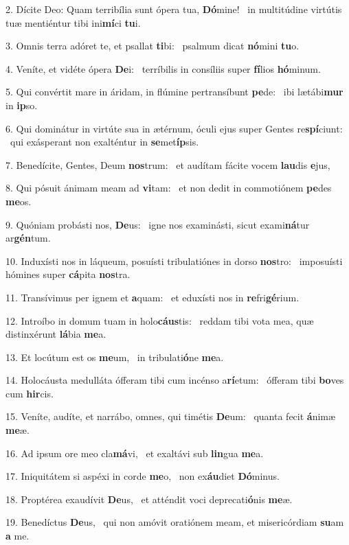 2. Dícite Deo: Quam terribília sunt ópera tua, \textbf{Dó}mine! \ast\  in multitúdine virtútis tuæ mentiéntur tibi ini\textbf{mí}ci \textbf{tu}i.\

3. Omnis terra adóret te, et psallat \textbf{ti}bi: \ast\  psalmum dicat \textbf{nó}mini \textbf{tu}o.\

4. Veníte, et vidéte ópera \textbf{De}i: \ast\  terríbilis in consíliis super \textbf{fí}lios \textbf{hó}minum.\

5. Qui convértit mare in áridam, in flúmine pertransíbunt \textbf{pe}de: \ast\  ibi lætábi\textbf{mur} in \textbf{ip}so.\

6. Qui dominátur in virtúte sua in ætérnum, óculi ejus super Gentes re\textbf{spí}ciunt: \ast\  qui exásperant non exalténtur in \textbf{se}met\textbf{íp}sis.\

7. Benedícite, Gentes, Deum \textbf{nos}trum: \ast\  et audítam fácite vocem \textbf{lau}dis \textbf{e}jus,\

8. Qui pósuit ánimam meam ad \textbf{vi}tam: \ast\  et non dedit in commotiónem \textbf{pe}des \textbf{me}os.\

9. Quóniam probásti nos, \textbf{De}us: \ast\  igne nos examinásti, sicut exami\textbf{ná}tur ar\textbf{gén}tum.\

10. Induxísti nos in láqueum, posuísti tribulatiónes in dorso \textbf{nos}tro: \ast\  imposuísti hómines super \textbf{cá}pita \textbf{nos}tra.\

11. Transívimus per ignem et \textbf{a}quam: \ast\  et eduxísti nos in \textbf{re}fri\textbf{gé}rium.\

12. Introíbo in domum tuam in holo\textbf{cáus}tis: \ast\  reddam tibi vota mea, quæ distinxérunt \textbf{lá}bia \textbf{me}a.\

13. Et locútum est os \textbf{me}um, \ast\  in tribulati\textbf{ó}ne \textbf{me}a.\

14. Holocáusta medulláta ófferam tibi cum incénso a\textbf{rí}etum: \ast\  ófferam tibi \textbf{bo}ves cum \textbf{hir}cis.\

15. Veníte, audíte, et narrábo, omnes, qui timétis \textbf{De}um: \ast\  quanta fecit \textbf{á}nimæ \textbf{me}æ.\

16. Ad ipsum ore meo cla\textbf{má}vi, \ast\  et exaltávi sub \textbf{lin}gua \textbf{me}a.\

17. Iniquitátem si aspéxi in corde \textbf{me}o, \ast\  non ex\textbf{áu}diet \textbf{Dó}minus.\

18. Proptérea exaudívit \textbf{De}us, \ast\  et atténdit voci deprecati\textbf{ó}nis \textbf{me}æ.\

19. Benedíctus \textbf{De}us, \ast\  qui non amóvit oratiónem meam, et misericórdiam \textbf{su}am \textbf{a} me.\

